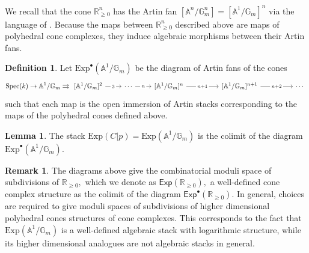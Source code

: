 \documentclass[10.5pt]{amsart}
\theoremstyle{definition}
\theoremstyle{definition}
\theoremstyle{definition}
\theoremstyle{definition}
\newtheorem{lemma}[theorem]{Lemma}
\newtheorem{remark}[theorem]{Remark}
\newtheorem{definition}[theorem]{Definition}
\begin{document}
We recall that the cone $\mathbb{R}_{\geq 0}^n$ has the Artin fan $[\mathbb{A}^n/\mathbb{G}_m^n] = [\mathbb{A}^1/\mathbb{G}_m]^n$ via the language of \cite{ccuw}. Because the maps between $\mathbb{R}_{\geq 0}^n$ described above are maps of polyhedral cone complexes, they induce algebraic morphisms between their Artin fans.
\begin{definition}
    Let $\mathrm{Exp}^{\bullet}(\mathbb{A}^1/\mathbb{G}_m)$ be the diagram of Artin fans of the cones $$\mathrm{Spec}(k) \to \mathbb{A}^1/\mathbb{G}_m \rightrightarrows 
	\begin{tikzcd}{[\mathbb{A}^1/\mathbb{G}_m]^2} & {\cdots} & {[\mathbb{A}^1/\mathbb{G}_m]^n} & & {[\mathbb{A}^1/\mathbb{G}_m]^{n+1}} & &\cdots 
	\arrow["3"{description}, from=1-1, to=1-2]
    \arrow["n"{description}, from=1-2, to=1-3]
    \arrow["n+1"{description}, from=1-3, to=1-5]
    \arrow["n+2"{description}, from=1-5, to=1-7]
\end{tikzcd} $$
such that each map is the open immersion of Artin stacks corresponding to the maps of the polyhedral cones defined above.
\end{definition}

\begin{lemma}
    The stack $\mathrm{Exp}(C|p) = \mathrm{Exp}(\mathbb{A}^1/\mathbb{G}_m)$ is the colimit of the diagram $\mathrm{Exp}^{\bullet}(\mathbb{A}^1/\mathbb{G}_m)$.
\end{lemma} 

\begin{remark}
    The diagrams above give the combinatorial moduli space of subdivisions of $\mathbb{R}_{\geq 0},$ which we denote as $\mathsf{Exp}(\mathbb{R}_{\geq 0}),$ a well-defined cone complex structure as the colimit of the diagram $\mathsf{Exp}^\bullet(\mathbb{R}_{\geq 0})$. In general, choices are required to give moduli spaces of subdivisions of higher dimensional polyhedral cones structures of cone complexes. This corresponds to the fact that $\mathrm{Exp}(\mathbb{A}^1/\mathbb{G}_m)$ is a well-defined algebraic stack with logarithmic structure, while its higher dimensional analogues are not algebraic stacks in general.
\end{remark}
\end{document}
